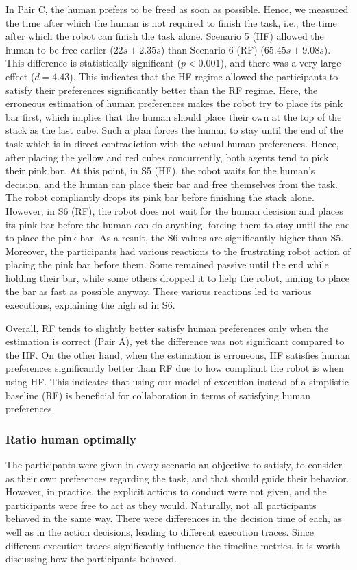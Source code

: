 In Pair C, the human prefers to be freed as soon as possible. Hence, we measured the time after which the human is not required to finish the task, i.e., the time after which the robot can finish the task alone. Scenario 5 (HF) allowed the human to be free earlier ($22s \pm 2.35s$) than Scenario 6 (RF) ($65.45s \pm 9.08s$). This difference is statistically significant ($p < 0.001$), and there was a very large effect ($d = 4.43$). This indicates that the HF regime allowed the participants to satisfy their preferences significantly better than the RF regime. 
Here, the erroneous estimation of human preferences makes the robot try to place its pink bar first, which implies that the human should place their own at the top of the stack as the last cube. Such a plan forces the human to stay until the end of the task which is in direct contradiction with the actual human preferences. Hence, after placing the yellow and red cubes concurrently, both agents tend to pick their pink bar. At this point, in S5 (HF), the robot waits for the human's decision, and the human can place their bar and free themselves from the task. The robot compliantly drops its pink bar before finishing the stack alone. However, in S6 (RF), the robot does not wait for the human decision and places its pink bar before the human can do anything, forcing them to stay until the end to place the pink bar. As a result, the S6 values are significantly higher than S5. Moreover, the participants had various reactions to the frustrating robot action of placing the pink bar before them. Some remained passive until the end while holding their bar, while some others dropped it to help the robot, aiming to place the bar as fast as possible anyway. These various reactions led to various executions, explaining the high \acrshort{sd} in S6.

Overall, RF tends to slightly better satisfy human preferences only when the estimation is correct (Pair A), yet the difference was not significant compared to the HF. On the other hand, when the estimation is erroneous, HF satisfies human preferences significantly better than RF due to how compliant the robot is when using HF. This indicates that using our model of execution instead of a simplistic baseline (RF) is beneficial for collaboration in terms of satisfying human preferences. 

\subsubsection*{Ratio human optimally}
The participants were given in every scenario an objective to satisfy, to consider as their own preferences regarding the task, and that should guide their behavior. However, in practice, the explicit actions to conduct were not given, and the participants were free to act as they would. Naturally, not all participants behaved in the same way. There were differences in the decision time of each, as well as in the action decisions, leading to different execution traces.
Since different execution traces significantly influence the timeline metrics, it is worth discussing how the participants behaved.

